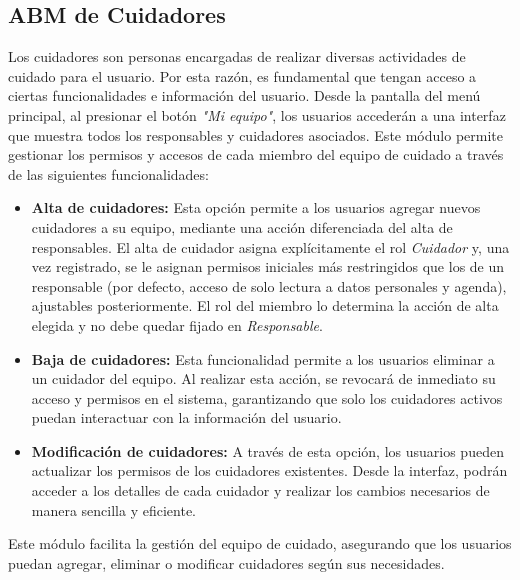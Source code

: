 \documentclass[a4paper,12pt]{article}
\begin{document}
    \subsection{ABM de Cuidadores}
    \par Los cuidadores son personas encargadas de realizar diversas actividades de cuidado para el usuario. Por esta razón, es fundamental que tengan acceso a ciertas funcionalidades e información del usuario. Desde la pantalla del menú principal, al presionar el botón \textit{"Mi equipo"}, los usuarios accederán a una interfaz que muestra todos los responsables y cuidadores asociados. Este módulo permite gestionar los permisos y accesos de cada miembro del equipo de cuidado a través de las siguientes funcionalidades:
    \begin{itemize}
        \item \textbf{Alta de cuidadores:} Esta opción permite a los usuarios agregar nuevos cuidadores a su equipo, mediante una acción diferenciada del alta de responsables. El alta de cuidador asigna explícitamente el rol \textit{Cuidador} y, una vez registrado, se le asignan permisos iniciales más restringidos que los de un responsable (por defecto, acceso de solo lectura a datos personales y agenda), ajustables posteriormente. El rol del miembro lo determina la acción de alta elegida y no debe quedar fijado en \textit{Responsable}.
        \item \textbf{Baja de cuidadores:} Esta funcionalidad permite a los usuarios eliminar a un cuidador del equipo. Al realizar esta acción, se revocará de inmediato su acceso y permisos en el sistema, garantizando que solo los cuidadores activos puedan interactuar con la información del usuario.
        \item \textbf{Modificación de cuidadores:} A través de esta opción, los usuarios pueden actualizar los permisos de los cuidadores existentes. Desde la interfaz, podrán acceder a los detalles de cada cuidador y realizar los cambios necesarios de manera sencilla y eficiente.
    \end{itemize}
    \par Este módulo facilita la gestión del equipo de cuidado, asegurando que los usuarios puedan agregar, eliminar o modificar cuidadores según sus necesidades.
\end{document}
